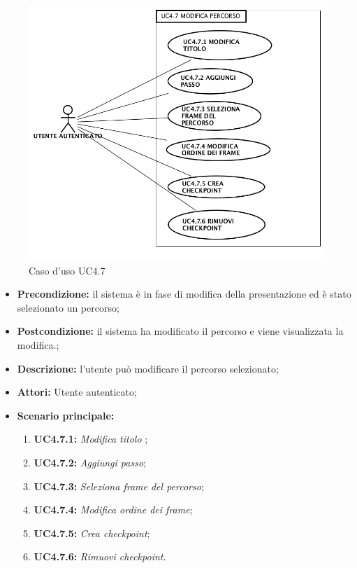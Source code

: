 \begin{figure}[h]
	\begin{center}
	\includegraphics[scale=0.4]{diagram/UC4-7.png}
	\caption{Caso d'uso UC4.7}
	\end{center}
\end{figure}
\begin{itemize}
	\item \textbf{Precondizione:} il sistema è in fase di modifica della presentazione ed è stato selezionato un percorso;
	\item \textbf{Postcondizione:} il sistema ha modificato il percorso e viene visualizzata la modifica.;
	\item \textbf{Descrizione:} l'utente può modificare il percorso selezionato;
	\item \textbf{Attori:} Utente autenticato;
	\item \textbf{Scenario principale:}
	\begin{enumerate}
		\item \textbf{ UC4.7.1:} \textit{ Modifica titolo };
		\item \textbf{ UC4.7.2:} \textit{ Aggiungi passo};
		\item \textbf{ UC4.7.3:} \textit{ Seleziona frame del percorso};
		\item \textbf{ UC4.7.4:} \textit{ Modifica ordine dei frame};
		\item \textbf{ UC4.7.5:} \textit{ Crea checkpoint};
		\item \textbf{ UC4.7.6:} \textit{ Rimuovi checkpoint}.
	\end{enumerate}
\end{itemize}
